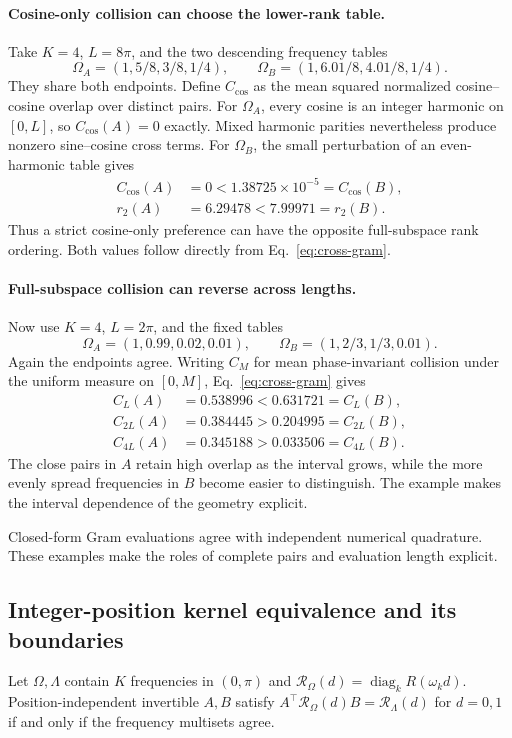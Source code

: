 \paragraph{Cosine-only collision can choose the lower-rank table.}
Take $K=4$, $L=8\pi$, and the two descending frequency tables
\[
\Omega_A=(1,5/8,3/8,1/4),\qquad
\Omega_B=(1,6.01/8,4.01/8,1/4).
\]
They share both endpoints. Define $C_{\cos}$ as the mean squared normalized
cosine--cosine overlap over distinct pairs. For $\Omega_A$, every cosine is
an integer harmonic on $[0,L]$, so $C_{\cos}(A)=0$ exactly. Mixed harmonic
parities nevertheless produce nonzero sine--cosine cross terms. For
$\Omega_B$, the small perturbation of an even-harmonic table gives
\begin{align}
C_{\cos}(A)&=0 < 1.38725\times10^{-5}=C_{\cos}(B),\\
r_2(A)&=6.29478 < 7.99971=r_2(B).
\label{eq:cosine-order-counterexample}
\end{align}
Thus a strict cosine-only preference can have the opposite full-subspace
rank ordering. Both values follow directly from Eq.~\eqref{eq:cross-gram}.

\paragraph{Full-subspace collision can reverse across lengths.}
Now use $K=4$, $L=2\pi$, and the fixed tables
\[
\Omega_A=(1,0.99,0.02,0.01),\qquad
\Omega_B=(1,2/3,1/3,0.01).
\]
Again the endpoints agree. Writing $C_M$ for mean phase-invariant collision
under the uniform measure on $[0,M]$, Eq.~\eqref{eq:cross-gram} gives
\begin{align}
C_L(A)&=0.538996 < 0.631721=C_L(B),\\
C_{2L}(A)&=0.384445 > 0.204995=C_{2L}(B),\\
C_{4L}(A)&=0.345188 > 0.033506=C_{4L}(B).
\label{eq:length-order-counterexample}
\end{align}
The close pairs in $A$ retain high overlap as the interval grows, while the
more evenly spread frequencies in $B$ become easier to distinguish. The
example makes the interval dependence of the geometry explicit.

Closed-form Gram evaluations agree with independent numerical quadrature.
These examples make the roles of complete pairs and evaluation length explicit.

\FloatBarrier
\subsection{Integer-position kernel equivalence and its boundaries}
\label{sec:discrete-kernel-proof}
\begin{corollary}\label{cor:discrete-kernel}
Let $\Omega,\Lambda$ contain $K$ frequencies in $(0,\pi)$ and
$\mathcal R_\Omega(d)=\operatorname{diag}_k R(\omega_kd)$.
Position-independent invertible $A,B$ satisfy
$A^\top\mathcal R_\Omega(d)B=\mathcal R_\Lambda(d)$ for $d=0,1$
if and only if the frequency multisets agree.
\end{corollary}

